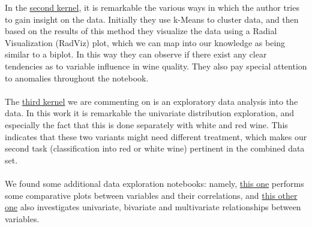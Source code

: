 \documentclass[10pt]{article}
\begin{document}
In the \href{https://www.kaggle.com/conradws/how-good-is-this-wine-m-l-for-quality-control}{second kernel}, it is remarkable the various ways in which the author tries to gain insight on the data. Initially they use k-Means to cluster data, and then based on the results of this method they visualize the data using a Radial Visualization (RadViz) plot, which we can map into our knowledge as being similar to a biplot. In this way they can observe if there exist any clear tendencies as to variable influence in wine quality. They also pay special attention to anomalies throughout the notebook. \\ \ \\
The \href{https://www.kaggle.com/danielpanizzo/red-and-white-wine-quality}{third kernel} we are commenting on is an exploratory data analysis into the data. In this work it is remarkable the univariate distribution exploration, and especially the fact that this is done separately with white and red wine. This indicates that these two variants might need different treatment, which makes our second task (classification into red or white wine) pertinent in the combined data set. \\ \ \\
We found some additional data exploration notebooks: namely, \href{https://rstudio-pubs-static.s3.amazonaws.com/57835_c4ace81da9dc45438ad0c286bcbb4224.html}{this one} performs some comparative plots between variables and their correlations, and \href{http://rstudio-pubs-static.s3.amazonaws.com/219996_9cc8cf9f2e7e41fe8912454c3ad2685a.html}{this other one} also investigates univariate, bivariate and multivariate relationships between variables.
\end{document}
